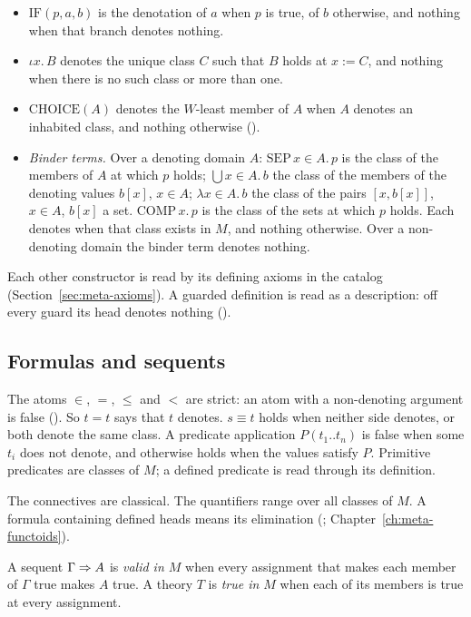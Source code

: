 \begin{itemize}
  $\mathrm{APPLY}(f, [a_1..a_n])$.
\item $\mathrm{IF}(p, a, b)$ is the denotation of $a$ when $p$ is true,
  of $b$ otherwise, and nothing when that branch denotes nothing.
\item $\iota x.\,B$ denotes the unique class $C$ such that $B$ holds at
  $x := C$, and nothing when there is no such class or more than one.
\item $\mathrm{CHOICE}(A)$ denotes the $W$-least member of $A$ when $A$
  denotes an inhabited class, and nothing otherwise ().
\item \emph{Binder terms.}  Over a denoting domain $A$:
  $\mathrm{SEP}\,x{\in}A.\,p$ is the class of the members of $A$ at which
  $p$ holds; $\bigcup x{\in}A.\,b$ the class of the members of the
  denoting values $b[x]$, $x\in A$; $\lambda x{\in}A.\,b$ the class of
  the pairs $[x, b[x]]$, $x\in A$, $b[x]$ a set.
  $\mathrm{COMP}\,x.\,p$ is the class of the sets at which $p$ holds.
  Each denotes when that class exists in $M$, and nothing otherwise.
  Over a non-denoting domain the binder term denotes nothing.
\end{itemize}
Each other constructor is read by its defining axioms in the catalog
(Section~\ref{sec:meta-axioms}).  A guarded definition is read as a
description: off every guard its head denotes nothing ().

\subsection{Formulas and sequents}

The atoms $\in$, $=$, $\leq$ and $<$ are strict: an atom with a
non-denoting argument is false ().  So $t = t$ says that $t$
denotes.  $s\equiv t$ holds when neither side denotes, or both denote the
same class.  A predicate application $P(t_1..t_n)$ is false when some
$t_i$ does not denote, and otherwise holds when the values satisfy $P$.
Primitive predicates are classes of $M$; a defined predicate is read
through its definition.

The connectives are classical.  The quantifiers range over all classes
of $M$.  A formula containing defined heads means its elimination
(; Chapter~\ref{ch:meta-functoids}).

A sequent $\Gamma\Rightarrow A$ is \emph{valid in $M$} when every assignment
that makes each member of $\Gamma$ true makes $A$ true.  A theory $T$ is
\emph{true in $M$} when each of its members is true at every
assignment.

